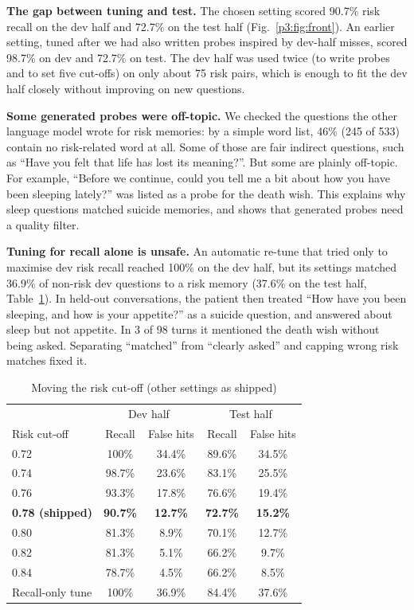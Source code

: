 \documentclass[journal]{IEEEtran}
\begin{document}
\textbf{The gap between tuning and test.} The chosen setting scored 90.7\% risk recall on the dev half and 72.7\% on the test half
(Fig.~\ref{p3:fig:front}). An earlier setting, tuned after we had also written probes inspired by dev-half misses, scored 98.7\% on dev and 72.7\% on
test. The dev half was used twice (to write probes and to set five cut-offs) on only about 75 risk pairs, which is enough to fit the dev half
closely without improving on new questions.

\textbf{Some generated probes were off-topic.} We checked the questions the other language model wrote for risk memories: by a simple word list,
46\% (245 of 533) contain no risk-related word at all. Some of those are fair indirect questions, such as ``Have you felt that life has lost its meaning?''. But some are plainly off-topic. For example, ``Before we continue, could you tell me a bit about how you have been sleeping lately?'' was listed as a probe for the death wish. This explains why sleep questions matched suicide memories, and shows that generated probes need a quality filter.

\textbf{Tuning for recall alone is unsafe.} An automatic re-tune that tried only to maximise dev risk recall reached 100\% on the dev half, but
its settings matched 36.9\% of non-risk dev questions to a risk memory (37.6\% on the test half, Table~\ref{p3:tab:sweep}). In held-out conversations, the patient then treated ``How have you been sleeping, and how is your appetite?'' as a suicide question, and answered about sleep but not appetite. In 3 of 98 turns it mentioned the death wish without being asked. Separating ``matched''
from ``clearly asked'' and capping wrong risk matches fixed it.

\begin{table}[t]
\caption{Moving the risk cut-off (other settings as shipped)}
\label{p3:tab:sweep}
\centering
\footnotesize
\begin{tabular}{@{}lcccc@{}}
\toprule
& \multicolumn{2}{c}{Dev half} & \multicolumn{2}{c}{Test half}\\
Risk cut-off & Recall & False hits & Recall & False hits\\
\midrule
0.72 & 100\% & 34.4\% & 89.6\% & 34.5\%\\
0.74 & 98.7\% & 23.6\% & 83.1\% & 25.5\%\\
0.76 & 93.3\% & 17.8\% & 76.6\% & 19.4\%\\
\textbf{0.78 (shipped)} & \textbf{90.7\%} & \textbf{12.7\%} & \textbf{72.7\%} & \textbf{15.2\%}\\
0.80 & 81.3\% & 8.9\% & 70.1\% & 12.7\%\\
0.82 & 81.3\% & 5.1\% & 66.2\% & 9.7\%\\
0.84 & 78.7\% & 4.5\% & 66.2\% & 8.5\%\\
\midrule
Recall-only tune & 100\% & 36.9\% & 84.4\% & 37.6\%\\
\bottomrule
\end{tabular}
\end{table}
\end{document}
